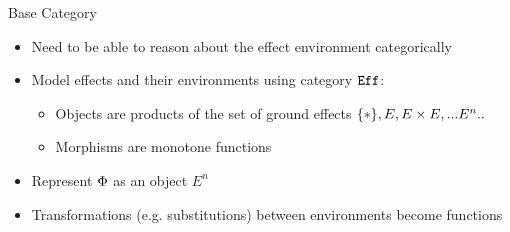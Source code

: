 \documentclass{beamer}
\newcommand\script[1]{}
\begin{document}
\begin{frame}{Base Category}
\begin{itemize}
    \item Need to be able to reason about the effect environment categorically
    \item Model effects and their environments using category $\Eff$: \begin{itemize}
        \item Objects are products of the set of ground effects $\{\singleton\} , E, E\times E,... E^n..$
        \item Morphisms are monotone functions
    \end{itemize}
    \item Represent $\P$ as an object $E^n$
    \item Transformations (e.g. substitutions) between environments become functions
\end{itemize}


    \script{
        - So we need a way of reasoning about the transformations of effect-variable environments in a category theoretic manner
        - To do this, we need a base category, containing a terminal object, an object $U$ representing the kind of effects, and finite products on $U$ 
        - $U^n$ represents the effect-variable environment of length $n$. We'll now use $I$ to indicate this.
        
        - Since all the ground effects have morphisms in this category, we can construct morphisms for substitutions and weakenings of the effect environment.
    }
\end{frame}
\end{document}
